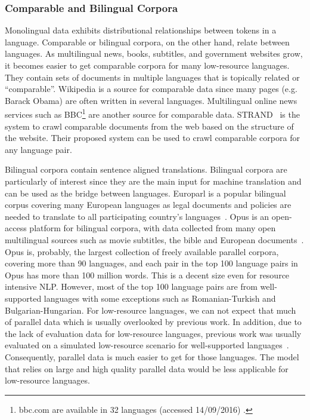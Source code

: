 \documentclass[12pt,twoside,final,hidelinks]{ltthesis}
\theoremstyle{definition}
\begin{document}
\subsubsection{Comparable and Bilingual Corpora}
Monolingual data exhibits distributional relationships between tokens in a language. Comparable or bilingual corpora, on the other hand, relate between languages. 
As multilingual news, books, subtitles, and government websites grow, it becomes easier to get comparable corpora for many low-resource languages. They contain sets of documents in multiple languages that is topically related or ``comparable''. Wikipedia is a source for comparable data since many pages (e.g. Barack Obama) are often written in several languages. Multilingual online news services such as BBC\footnote{bbc.com are available in 32 languages  (accessed 14/09/2016) .} are another source for comparable data. STRAND~\cite{Resnik:2003:WPC:964751.964753} is the system to crawl comparable documents from the web based on the structure of the website. Their proposed system can be used to crawl comparable corpora for any language pair. %

Bilingual corpora contain sentence 
aligned translations. Bilingual corpora are particularly of interest since they are the 
main input for machine translation and can be used as the bridge between languages. 
Europarl is a popular bilingual corpus covering many European languages 
as legal documents and policies are needed to translate to all 
participating country's languages~\cite{europarl}. Opus is an open-access platform 
for bilingual corpora, with data collected from many open
 multilingual sources such as movie subtitles, the bible and European documents~\cite{TIEDEMANN12.463.L12-1246}. Opus is, probably, the
 largest collection of freely available parallel corpora, covering more than 90 
 languages, and each pair in the top 100 language pairs in Opus has more than 100 million 
 words. This is a decent size even for resource intensive NLP. However, most of the 
 top 100 language pairs are from well-supported languages with some 
 exceptions such as Romanian-Turkish and Bulgarian-Hungarian. For low-resource languages, we can not expect that much of parallel data which is usually overlooked by previous work. 
In addition, due to the lack of evaluation data for low-resource languages, previous work was usually evaluated on a simulated low-resource scenario for well-supported 
languages~\cite{Das:2011}. Consequently, parallel data is much easier to get for those languages. The model that relies on large and high quality parallel data would be less applicable for low-resource languages. 
\end{document}
